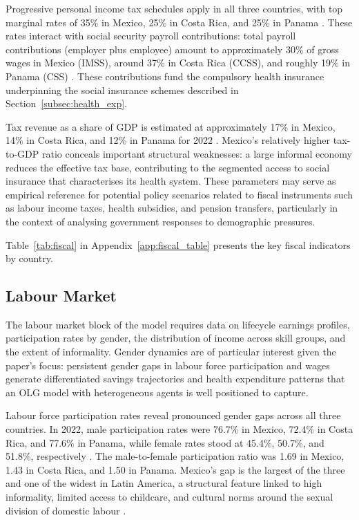 \documentclass[12pt,a4paper]{article}
\begin{document}
Progressive personal income tax schedules apply in all three countries,
with top marginal rates of 35\% in Mexico, 25\% in Costa Rica, and
25\% in Panama \citep{PwCWWTS2024}. These rates interact with social
security payroll contributions: total payroll contributions (employer
plus employee) amount to approximately 30\% of gross wages in Mexico
(IMSS), around 37\% in Costa Rica (CCSS), and roughly 19\% in Panama
(CSS) \citep{CCSS2023, PwCWWTS2024}. These contributions fund the
compulsory health insurance underpinning the social insurance schemes
described in Section~\ref{subsec:health_exp}.

Tax revenue as a share of GDP is estimated at approximately 17\% in
Mexico, 14\% in Costa Rica, and 12\% in Panama for 2022
\citep{OECDRevStats2024, WorldBankWDI2024}. Mexico's relatively higher
tax-to-GDP ratio conceals important structural weaknesses: a large
informal economy reduces the effective tax base, contributing to the
segmented access to social insurance that characterises its health
system. These parameters may serve as empirical reference for potential policy scenarios related to fiscal instruments such as labour income taxes, health subsidies, and pension transfers, particularly in the context of analysing government responses to demographic pressures.

Table~\ref{tab:fiscal} in Appendix~\ref{app:fiscal_table} presents the key fiscal indicators by country.

\subsection{Labour Market}\label{subsec:labour}

The labour market block of the model requires data on lifecycle
earnings profiles, participation rates by gender, the distribution of
income across skill groups, and the extent of informality. Gender
dynamics are of particular interest given the paper's focus: persistent
gender gaps in labour force participation and wages generate
differentiated savings trajectories and health expenditure patterns
that an OLG model with heterogeneous agents is well positioned to
capture.

Labour force participation rates reveal pronounced gender gaps across
all three countries. In 2022, male participation rates were 76.7\% in
Mexico, 72.4\% in Costa Rica, and 77.6\% in Panama, while female rates
stood at 45.4\%, 50.7\%, and 51.8\%, respectively \citep{ECLACILO2023,
ILOILOSTAT2023}. The male-to-female participation ratio was 1.69 in
Mexico, 1.43 in Costa Rica, and 1.50 in Panama. Mexico's gap is the
largest of the three and one of the widest in Latin America, a
structural feature linked to high informality, limited access to
childcare, and cultural norms around the sexual division of domestic
labour \citep{IMF2023, ECLAC2023}.
\end{document}
